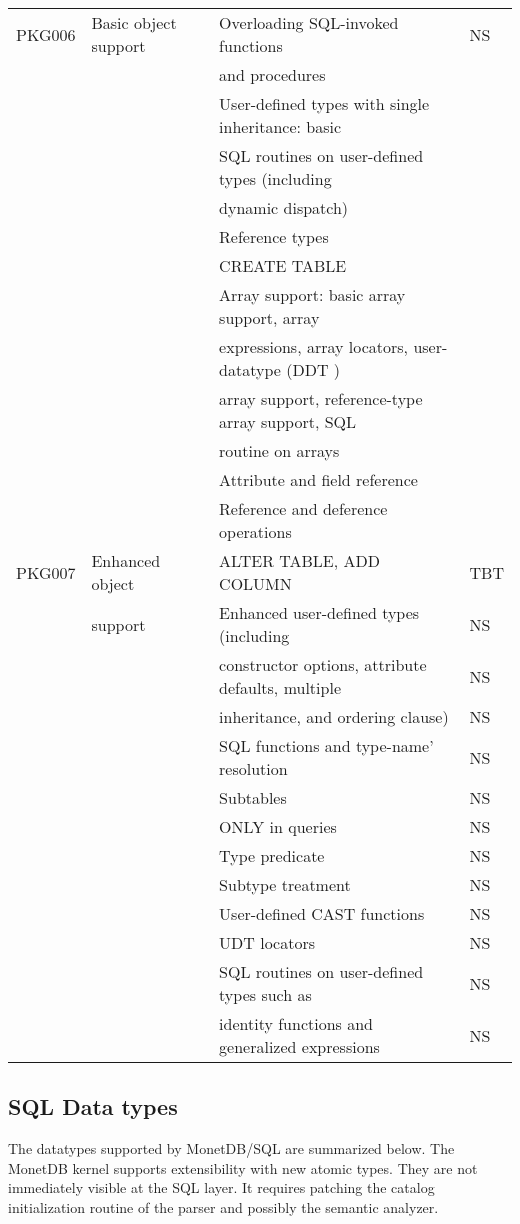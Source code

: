 \documentclass[10pt,twocolumn,fleqn]{article}
\begin{document}
\begin{tabular}{l | l | l| l |}
PKG006	&Basic object support&Overloading SQL-invoked functions & NS\\
	&		& and procedures	& \\
	&	 	&User-defined types with single inheritance: basic	& \\
	&	&SQL routines on user-defined types (including	& \\
	&	&dynamic dispatch)	& \\
	&	 	&Reference types	& \\
	&	 	&CREATE TABLE	& \\
	&	 	&Array support: basic array support, array	& \\
	&	&expressions, array locators, user-datatype (DDT )	& \\
	&	&array support, reference-type array support, SQL	& \\
	&	&routine on arrays	& \\
	&	 	&Attribute and field reference	& \\
	&	 	&Reference and deference operations	& \\\hline
PKG007	& Enhanced object&ALTER TABLE, ADD COLUMN	& TBT \\
	& support	&Enhanced user-defined types (including	& NS\\
	&	&constructor options, attribute defaults, multiple	& NS\\
	&	&inheritance, and ordering clause)	& NS \\
	&	 	&SQL functions and type-name' resolution	& NS \\
	&	 	&Subtables	& NS \\
	&	 	&ONLY in queries	& NS \\
	&	 	&Type predicate	& NS \\
	&	 	&Subtype treatment	& NS \\
	&	 	&User-defined CAST functions	& NS \\
	&	 	&UDT locators	& NS \\
	&	 	&SQL routines on user-defined types such as	& NS \\
	&	&identity functions and generalized expressions	& NS \\
\end{tabular}	


\subsection{SQL Data types}
The datatypes supported by MonetDB/SQL are summarized below.
The MonetDB kernel supports extensibility with new atomic types.
They are not immediately visible at the SQL layer. It requires
patching the catalog initialization routine of the parser
and possibly the semantic analyzer.
\end{document}
